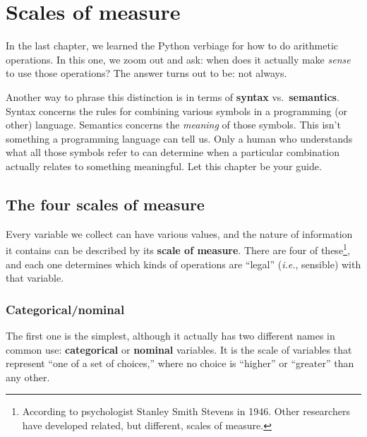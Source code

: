 


\chapter{Scales of measure}

In the last chapter, we learned the Python verbiage for how to do arithmetic
operations. In this one, we zoom out and ask: when does it actually make
\textit{sense} to use those operations? The answer turns out to be: not always.

Another way to phrase this distinction is in terms of \textbf{syntax}
vs.~\textbf{semantics}. Syntax concerns the rules for combining various symbols
in a programming (or other) language. Semantics concerns the \textit{meaning}
of those symbols. This isn't something a programming language can tell us. Only
a human who understands what all those symbols refer to can determine when a
particular combination actually relates to something meaningful. Let this
chapter be your guide.

\section{The four scales of measure}

Every variable we collect can have various values, and the nature of
information it contains can be described by its \textbf{scale of measure}.
There are four of these\footnote{According to psychologist Stanley Smith
Stevens in 1946. Other researchers have developed related, but different,
scales of measure.}, and each one determines which kinds of operations are
``legal'' (\textit{i.e.}, sensible) with that variable.

\subsection{Categorical/nominal}

The first one is the simplest, although it actually has two different names in
common use: \textbf{categorical} or \textbf{nominal} variables. It is the scale
of variables that represent ``one of a set of choices,'' where no choice is
``higher'' or ``greater'' than any other.

